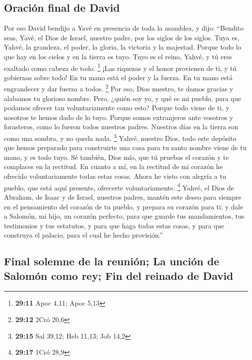 \hypertarget{oraciuxf3n-final-de-david}{%
\subsection{Oración final de David}\label{oraciuxf3n-final-de-david}}

 Por eso David bendijo a Yavé en presencia de toda la
asamblea, y dijo: ``Bendito seas, Yavé, el Dios de Israel, nuestro
padre, por los siglos de los siglos.  Tuya es, Yahvé, la
grandeza, el poder, la gloria, la victoria y la majestad. Porque todo lo
que hay en los cielos y en la tierra es tuyo. Tuyo es el reino, Yahvé, y
tú eres exaltado como cabeza de todo. \footnote{\textbf{29:11} Apoc
  4,11; Apoc 5,13}  ¡Las riquezas y el honor provienen de
ti, y tú gobiernas sobre todo! En tu mano está el poder y la fuerza. En
tu mano está engrandecer y dar fuerza a todos. \footnote{\textbf{29:12}
  2Cró 20,6}  Por eso, Dios nuestro, te damos gracias y
alabamos tu glorioso nombre.  Pero, ¿quién soy yo, y qué
es mi pueblo, para que podamos ofrecer tan voluntariamente como esto?
Porque todo viene de ti, y nosotros te hemos dado de lo tuyo.
 Porque somos extranjeros ante vosotros y forasteros,
como lo fueron todos nuestros padres. Nuestros días en la tierra son
como una sombra, y no queda nada. \footnote{\textbf{29:15} Sal 39,12;
  Heb 11,13; Job 14,2}  Yahvé, nuestro Dios, todo este
depósito que hemos preparado para construirte una casa para tu santo
nombre viene de tu mano, y es todo tuyo.  Sé también,
Dios mío, que tú pruebas el corazón y te complaces en la rectitud. En
cuanto a mí, en la rectitud de mi corazón he ofrecido voluntariamente
todas estas cosas. Ahora he visto con alegría a tu pueblo, que está aquí
presente, ofrecerte voluntariamente. \footnote{\textbf{29:17} 1Cró 28,9}
 Yahvé, el Dios de Abraham, de Isaac y de Israel,
nuestros padres, mantén este deseo para siempre en el pensamiento del
corazón de tu pueblo, y prepara su corazón para ti;  y
dale a Salomón, mi hijo, un corazón perfecto, para que guarde tus
mandamientos, tus testimonios y tus estatutos, y para que haga todas
estas cosas, y para que construya el palacio, para el cual he hecho
provisión.''

\hypertarget{final-solemne-de-la-reuniuxf3n-la-unciuxf3n-de-salomuxf3n-como-rey-fin-del-reinado-de-david}{%
\subsection{Final solemne de la reunión; La unción de Salomón como rey;
Fin del reinado de
David}\label{final-solemne-de-la-reuniuxf3n-la-unciuxf3n-de-salomuxf3n-como-rey-fin-del-reinado-de-david}}


